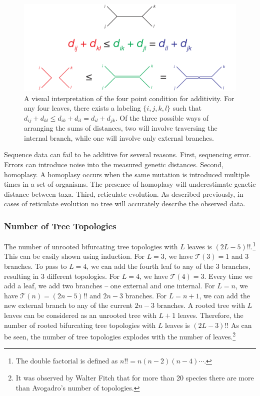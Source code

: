 \begin{figure}
\centering
\includegraphics[]{./fig/background/four_point_condition.pdf}
\caption[The four point condition for additivity]{A visual interpretation of the four point condition for additivity. For any four leaves, there exists a labeling $\{i,j,k,l\}$ such that $d_{ij}+d_{kl}\leq d_{ik}+d_{il} = d_{il}+d_{jk}$. Of the three possible ways of arranging the sums of distances, two will involve traversing the internal branch, while one will involve only external branches.}
\label{fig:bg:four_point_condition}
\end{figure}

Sequence data can fail to be additive for several reasons.
First, sequencing error.
Errors can introduce noise into the measured genetic distances.
Second, homoplasy.
A homoplasy occurs when the same mutation is introduced multiple times in a set of organisms.
The presence of homoplasy will underestimate genetic distance between taxa.
Third, reticulate evolution.
As described previously, in cases of reticulate evolution no tree will accurately describe the observed data.

\subsubsection{Number of Tree Topologies}
\label{bg:bio:phylo:topologies}

The number of unrooted bifurcating tree topologies with $L$ leaves is $(2L-5)!!$.\footnote{The double factorial is defined as $n!!=n(n-2)(n-4)\cdots$.}
This can be easily shown using induction.
For $L=3$, we have $\mathcal{T}(3)=1$ and $3$ branches.
To pass to $L=4$, we can add the fourth leaf to any of the $3$ branches, resulting in $3$ different topologies.
For $L=4$, we have $\mathcal{T}(4)=3$.
Every time we add a leaf, we add two branches -- one external and one internal.
For $L=n$, we have $\mathcal{T}(n)=(2n-5)!!$ and $2n-3$ branches.
For $L=n+1$, we can add the new external branch to any of the current $2n-3$ branches.
A rooted tree with $L$ leaves can be considered as an unrooted tree with $L+1$ leaves.
Therefore, the number of rooted bifurcating tree topologies with $L$ leaves is $(2L-3)!!$
As can be seen, the number of tree topologies explodes with the number of leaves.\footnote{It was observed by Walter Fitch that for more than 20 species there are more than Avogadro's number of topologies.}

